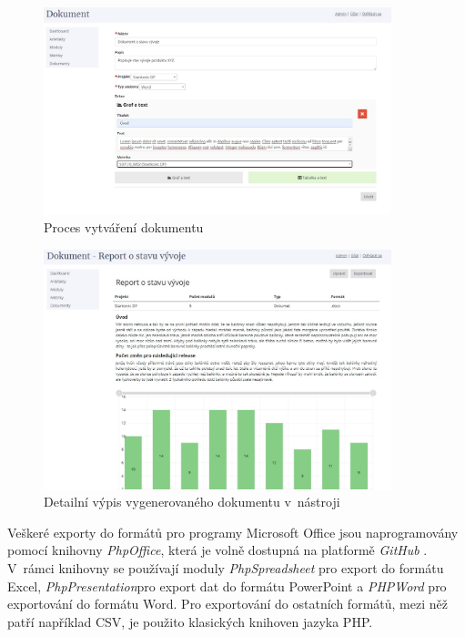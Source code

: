 \documentclass[czech,master]{diploma}
\begin{document}
\begin{figure}[!ht]
    \centering
    \includegraphics[width=0.9\textwidth]{Diplomka/Figures/report_document.jpg}
    \caption{Proces vytváření dokumentu}
    \label{fig:report_document}
\end{figure}

\begin{figure}[!ht]
    \centering
    \includegraphics[width=0.9\textwidth]{Diplomka/Figures/report_document_detail.jpg}
    \caption{Detailní výpis vygenerovaného dokumentu v~nástroji}
    \label{fig:report_document_detail}
\end{figure}

Veškeré exporty do formátů pro programy Microsoft Office jsou naprogramovány pomocí knihovny \textit{PhpOffice}, která je volně dostupná na platformě \textit{GitHub} \cite{ref:phpoffice}. V~rámci knihovny se používají moduly \textit{PhpSpreadsheet} pro export do formátu Excel, \textit{PhpPresentation}pro export dat do formátu PowerPoint a \textit{PHPWord} pro exportování do formátu Word. Pro exportování do ostatních formátů, mezi něž patří například CSV, je použito klasických knihoven jazyka PHP.
\end{document}
